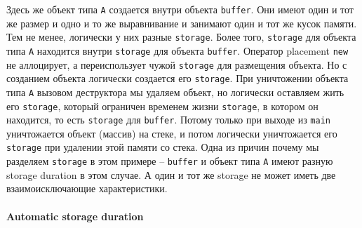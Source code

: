 \documentclass{article}
\begin{document}
Здесь же объект типа \verb"A" создается внутри объекта \verb"buffer".
Они имеют один и тот же размер и одно и то же выравнивание и занимают один и тот же кусок памяти.
Тем не менее, логически у них разные \verb"storage".
Более того, \verb"storage" для объекта типа \verb"A" находится внутри \verb"storage" для объекта \verb"buffer".
Оператор placement \verb"new" не аллоцирует, а переиспользует чужой \verb"storage" для размещения объекта.
Но с созданием объекта логически создается его \verb"storage".
При уничтожении объекта типа \verb"A" вызовом деструктора мы удаляем объект, но логически оставляем жить его \verb"storage", который ограничен временем жизни \verb"storage", в котором он находится, то есть \verb"storage" для \verb"buffer".
Потому только при выходе из \verb"main" уничтожается объект (массив) на стеке, и потом логически уничтожается его \verb"storage" при удалении этой памяти со стека.
Одна из причин почему мы разделяем \verb"storage" в этом примере -- \verb"buffer" и объект типа \verb"A" имеют разную storage duration в этом случае.
А один и тот же storage не может иметь две взаимоисключающие характеристики.

\paragraph{Automatic storage duration}
\end{document}
